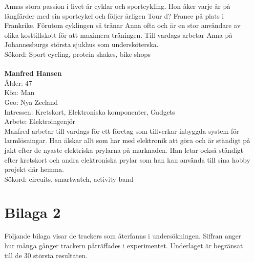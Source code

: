 \documentclass[a4paper,11pt]{article}
\begin{document}
{\begin{thebibliography}{888}
Annas stora passion i livet är cyklar och sportcykling. Hon åker varje år på långfärder med sin sportcykel och följer årligen Tour d? France på plats i Frankrike. Förutom cyklingen så tränar Anna ofta och är en stor användare av olika kosttillskott för att maximera träningen. Till vardags arbetar Anna på Johannesburgs största sjukhus som undersköterska. \\

Sökord: Sport cycling, protein shakes, bike shops \\\\

\textbf{Manfred Hansen} \\
Ålder: 47 \\
Kön: Man \\
Geo: Nya Zeeland \\
Intressen: Kretskort, Elektroniska komponenter, Gadgets\\
Arbete: Elektroingenjör\\

Manfred arbetar till vardags för ett företag som tillverkar inbyggda system för larmlösningar. Han älskar allt som har med elektronik att göra och är ständigt på jakt efter de nyaste elektriska prylarna på marknaden. Han letar också ständigt efter kretskort och andra elektroniska prylar som han kan använda till sina hobby projekt där hemma. \\

Sökord: circuits, smartwatch, activity band


\newpage

\section*{Bilaga 2}
Följande bilaga visar de trackers som återfanns i undersökningen. Siffran anger hur många gånger trackern påträffades i experimentet. Underlaget är begränsat till de 30 största resultaten. \\\\

\begin{tabular}{l c r}
	

\end{tabular}
\end{thebibliography}}
\end{document}
